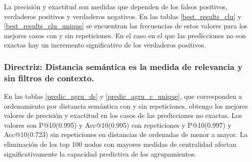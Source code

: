 La precisión y exactitud son medidas que dependen de los falsos positivos, verdaderos positivos y verdaderos negativos. En las  tablas \ref{best_results_clu} y \ref{best_results_clu_unique} se encuentran las frecuencias de estos valores para los mejores casos con y sin repeticiones. En el caso en el que las predicciones no son exactas  hay un incremento significativo de los verdaderos positivos.

\subsubsection{Directriz: Distancia semántica es la medida de relevancia y sin filtros de contexto.}

En las tablas \ref{predic_agru_ds} y \ref{predic_agru_c_unique}, que corresponden a ordenamiento por distancia semántica con y sin repeticiones,  obtengo los mejores valores de precisión y exactitud en los casos de las predicciones no exactas. Los valores son  P@10(\num{0,995}) y Acc@10(\num{0,995}) con repeticiones y P@10(\num{0,997}) y Acc@10(\num{0,723}) sin repeticiones en distancias de ordenadas de menor a mayor. La eliminación de los top 100 nodos con mayores medidas de centralidad afectan significativamente la capacidad predictiva de los agrupamientos. 


